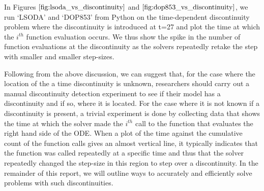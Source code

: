 In Figures $\ref{fig:lsoda_vs_discontinuity}$ and $\ref{fig:dop853_vs_discontinuity}$, we run `LSODA' and `DOP853' from Python on the time-dependent discontinuity problem where the discontinuity is introduced at t=27 and plot the time at which the $i^{th}$ function evaluation occurs. We thus show the spike in the number of function evaluations at the discontinuity as the solvers repeatedly retake the step with smaller and smaller step-sizes.

Following from the above discussion, we can suggest that, for the case where the location of the a time discontinuity is unknown, researchers should carry out a manual discontinuity detection experiment to see if their model has a discontinuity and if so, where it is located. For the case where it is not known if a discontinuity is present, a trivial experiment is done by collecting data that shows the time at which the solver made the $i^{th}$ call to the function that evaluates the right hand side of the ODE. When a plot of the time against the cumulative count of the function calls gives an almost vertical line, it typically indicates that the function was called repeatedly at a specific time and thus that the solver repeatedly changed the step-size in this region to step over a discontinuity. In the remainder of this report, we will outline ways to accurately and efficiently solve problems with such discontinuities.

